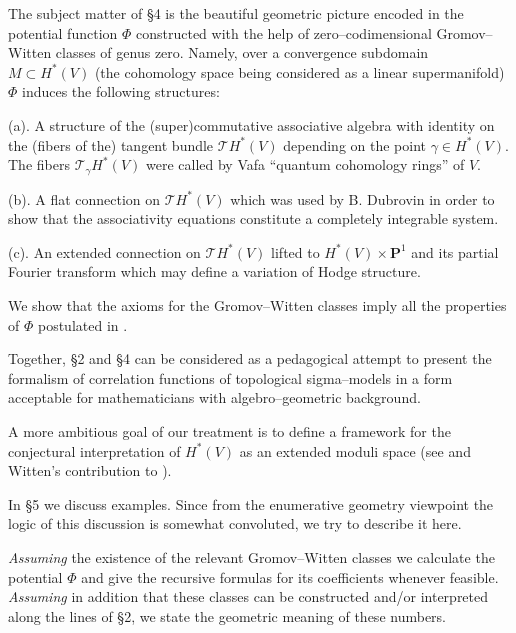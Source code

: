 \documentclass[reqno]{amsart}
\theoremstyle{definition}
\begin{document}
\smallskip

The subject matter of \S 4 is the beautiful geometric picture encoded
in the potential function $\Phi$ constructed with the help of
zero--codimensional Gromov--Witten classes of genus zero.
Namely, over a convergence subdomain $M\subset H^*(V)$ (the cohomology
space being considered as a linear supermanifold) $\Phi$ induces
the following structures:

\smallskip

(a). A structure of the (super)commutative associative algebra
with identity on the (fibers of the) tangent bundle $\mathcal{T}H^*(V)$
depending on the point $\gamma \in H^*(V)$. The fibers
$\mathcal{T}_{\gamma}H^*(V)$ were called by Vafa ``quantum cohomology
rings'' of $V$.

\smallskip

(b). A flat connection on $\mathcal{T}H^*(V)$ which was used by
B. Dubrovin \cite{D} in order to show that the associativity
equations constitute a completely integrable system.

\smallskip

(c). An extended connection on $\mathcal{T}H^*(V)$ lifted to
$H^*(V)\times \mathbf{P}^1$ and its partial Fourier transform
which may define a variation of Hodge structure.

\smallskip

We show that the axioms for the Gromov--Witten classes
imply all the properties of $\Phi$ postulated in \cite{D}.

\smallskip

Together, \S 2 and \S 4 can be considered as a pedagogical
attempt to present the formalism of correlation functions
of topological sigma--models in a form acceptable for mathematicians
with algebro--geometric background.

\smallskip

A more ambitious goal of our treatment is to define a framework
for the conjectural interpretation of $H^*(V)$ as an
extended moduli space (see \cite{Ko} and Witten's contribution
to \cite{Y}).

\smallskip

In \S 5 we discuss examples.
Since from the enumerative geometry viewpoint the logic
of this discussion is somewhat convoluted, we try to describe it
here.

\smallskip

\textit{Assuming} the existence of the relevant Gromov--Witten
classes we calculate the potential $\Phi$ and give the
recursive formulas for its coefficients whenever feasible.
\textit{Assuming} in addition that these classes can be
constructed and/or interpreted along the lines of \S 2,
we state the geometric meaning of these numbers.
\end{document}
